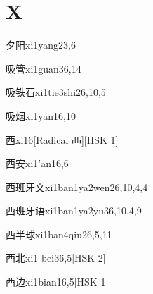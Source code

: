 
\section*{X}

\begin{entry}{夕阳}{xi1yang2}{3,6}
\end{entry}

\begin{entry}{吸管}{xi1guan3}{6,14}
\end{entry}

\begin{entry}{吸铁石}{xi1tie3shi2}{6,10,5}
\end{entry}

\begin{entry}{吸烟}{xi1yan1}{6,10}
\end{entry}

\begin{entry}{西}{xi1}{6}[Radical 襾][HSK 1]
\end{entry}

\begin{entry}{西安}{xi1'an1}{6,6}
\end{entry}

\begin{entry}{西班牙文}{xi1ban1ya2wen2}{6,10,4,4}
\end{entry}

\begin{entry}{西班牙语}{xi1ban1ya2yu3}{6,10,4,9}
\end{entry}

\begin{entry}{西半球}{xi1ban4qiu2}{6,5,11}
\end{entry}

\begin{entry}{西北}{xi1 bei3}{6,5}[HSK 2]
\end{entry}

\begin{entry}{西边}{xi1bian1}{6,5}[HSK 1]
\end{entry}

